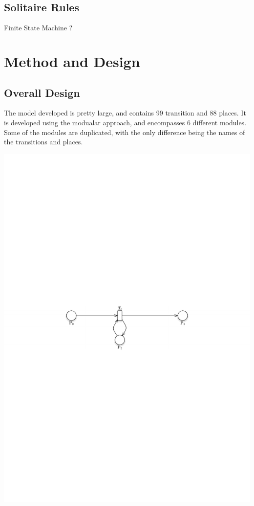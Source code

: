\documentclass[runningheads,a4paper]{llncs}
\begin{document}
\subsection{Solitaire Rules}

Finite State Machine ?


\section{Method and Design}
\label{sec:2_method_and_design}
\subsection{Overall Design}
The model developed is pretty large, and contains 99 transition and 88 places. It is developed using the modualar approach, and encompasses 6 different modules. Some of the modules are duplicated, with the only difference being the names of the transitions and places.
\begin{center}
	\includegraphics[width=\textwidth]{images/test}
\end{center}
\end{document}
